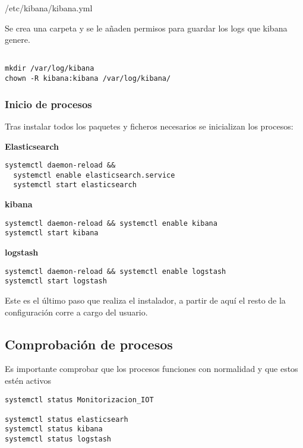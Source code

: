 /etc/kibana/kibana.yml
 
Se crea una carpeta y se le añaden permisos para guardar los logs que kibana genere.
 
\begin{lstlisting}[frame=single]  

mkdir /var/log/kibana
chown -R kibana:kibana /var/log/kibana/

\end{lstlisting}
 
 \subsubsection{Inicio de procesos}
 
 Tras instalar todos los paquetes y ficheros necesarios se inicializan los procesos:
 
 \textbf{Elasticsearch}
 
 \begin{lstlisting}[frame=single]  
  systemctl daemon-reload && 
  systemctl enable elasticsearch.service
  systemctl start elasticsearch
\end{lstlisting}
 
 
 \textbf{kibana}
 
 \begin{lstlisting}[frame=single]  
systemctl daemon-reload && systemctl enable kibana
systemctl start kibana
\end{lstlisting}
 
\textbf{logstash}
 
\begin{lstlisting}[frame=single] 
systemctl daemon-reload && systemctl enable logstash
systemctl start logstash

\end{lstlisting}
 
 Este es el último paso que realiza el instalador, a partir de aquí el resto de la configuración corre a cargo del usuario.
 

\subsection{Comprobación de procesos}

Es importante comprobar que los procesos funciones con normalidad y que estos estén activos 

\begin{lstlisting}[frame=single]  
systemctl status Monitorizacion_IOT

systemctl status elasticsearh
systemctl status kibana
systemctl status logstash
\end{lstlisting}

